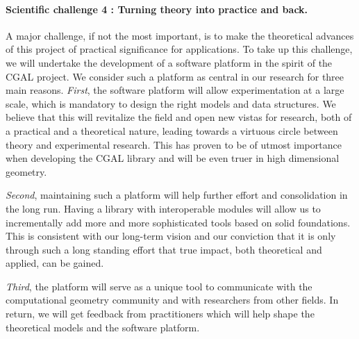 \paragraph{Scientific challenge 4 : Turning theory into practice and back.}%
A major challenge, if not the most important, is to make the theoretical advances of this project of practical significance for applications.  To take up this challenge,
we will undertake the development of a software platform in the spirit of the CGAL project. We consider such a platform as central in our research  for three main reasons.  {\em First}, the software platform will allow experimentation at a large scale, which is mandatory to design the right models and data structures. We believe that this will revitalize the field and open new vistas for research, both of a practical and a theoretical nature, leading towards a virtuous circle between theory and experimental research. This has proven to be of utmost importance when developing the CGAL library and will be even truer in high dimensional geometry.

{\em Second}, maintaining such a platform will help further effort and consolidation in the long run.  Having a library with interoperable modules will allow us to incrementally add more and more sophisticated tools based on solid foundations.  This is consistent with our long-term vision and our conviction that it is only through such a long standing effort that true impact, both theoretical and applied, can be gained.

{\em Third}, the platform will serve as a unique tool to communicate with the computational geometry community and with researchers from other fields. 
 In return, we will get feedback from practitioners which will help shape the theoretical models and the software platform.


 




